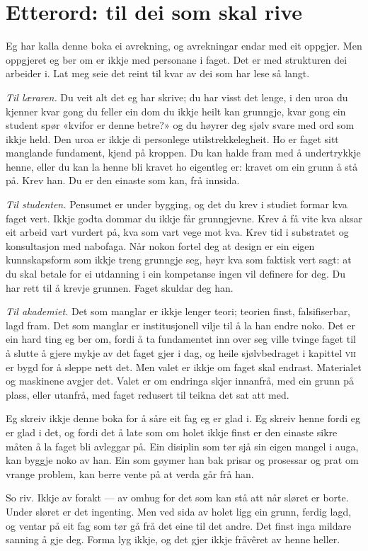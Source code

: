 \chapter*{Etterord: til dei som skal rive}

Eg har kalla denne boka ei avrekning, og avrekningar endar med eit oppgjer. Men oppgjeret eg ber om er ikkje med personane i faget. Det er med strukturen dei arbeider i. Lat meg seie det reint til kvar av dei som har lese så langt.

\emph{Til læraren.} Du veit alt det eg har skrive; du har visst det lenge, i den uroa du kjenner kvar gong du feller ein dom du ikkje heilt kan grunngje, kvar gong ein student spør «kvifor er denne betre?» og du høyrer deg sjølv svare med ord som ikkje held. Den uroa er ikkje di personlege utilstrekkelegheit. Ho er faget sitt manglande fundament, kjend på kroppen. Du kan halde fram med å undertrykkje henne, eller du kan la henne bli kravet ho eigentleg er: kravet om ein grunn å stå på. Krev han. Du er den einaste som kan, frå innsida.

\emph{Til studenten.} Pensumet er under bygging, og det du krev i studiet formar kva faget vert. Ikkje godta dommar du ikkje får grunngjevne. Krev å få vite kva aksar eit arbeid vart vurdert på, kva som vart vege mot kva. Krev tid i substratet og konsultasjon med nabofaga. Når nokon fortel deg at design er ein eigen kunnskapsform som ikkje treng grunngje seg, høyr kva som faktisk vert sagt: at du skal betale for ei utdanning i ein kompetanse ingen vil definere for deg. Du har rett til å krevje grunnen. Faget skuldar deg han.

\emph{Til akademiet.} Det som manglar er ikkje lenger teori; teorien finst, falsifiserbar, lagd fram. Det som manglar er institusjonell vilje til å la han endre noko. Det er ein hard ting eg ber om, fordi å ta fundamentet inn over seg ville tvinge faget til å slutte å gjere mykje av det faget gjer i dag, og heile sjølvbedraget i kapittel \textsc{vii} er bygd for å sleppe nett det. Men valet er ikkje om faget skal endrast. Materialet og maskinene avgjer det. Valet er om endringa skjer innanfrå, med ein grunn på plass, eller utanfrå, med faget redusert til teikna det sat att med.

Eg skreiv ikkje denne boka for å såre eit fag eg er glad i. Eg skreiv henne fordi eg er glad i det, og fordi det å late som om holet ikkje finst er den einaste sikre måten å la faget bli avleggar på. Ein disiplin som tør sjå sin eigen mangel i auga, kan byggje noko av han. Ein som gøymer han bak prisar og prosessar og prat om vrange problem, kan berre vente på at verda går frå han.

So riv. Ikkje av forakt — av omhug for det som kan stå att når sløret er borte. Under sløret er det ingenting. Men ved sida av holet ligg ein grunn, ferdig lagd, og ventar på eit fag som tør gå frå det eine til det andre. Det finst inga mildare sanning å gje deg. Forma lyg ikkje, og det gjer ikkje fråvêret av henne heller.
